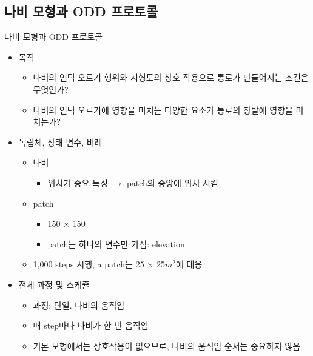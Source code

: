 \documentclass[hyperref={unicode}]{beamer}
\begin{document}
\subsection*{나비 모형과 ODD 프로토콜}
\begin{frame}{나비 모형과 ODD 프로토콜}
\begin{itemize}
\item 목적
	\begin{itemize}
	\item 나비의 언덕 오르기 행위와 지형도의 상호 작용으로 통로가 만들어지는 조건은 무엇인가?
	\item 나비의 언덕 오르기에 영향을 미치는 다양한 요소가 통로의 창발에 영향을 미치는가?
	\end{itemize}
\end{itemize}	
\end{frame}

\begin{frame}
\begin{itemize}
\item 독립체, 상태 변수, 비례
	\begin{itemize}
	\item 나비
		\begin{itemize}
		\item 위치가 중요 특징 $\rightarrow$ patch의 중앙에 위치 시킴
		\end{itemize}
	\item patch
		\begin{itemize}
		\item 150 $\times$ 150 
		\item patch는 하나의 변수만 가짐: elevation
		\end{itemize}
	\item 1,000 steps 시행, a patch는 25 $\times$ 25$m^{2}$에 대응
	\end{itemize}
\end{itemize}	
\end{frame}

\begin{frame}
\begin{itemize}
\item 전체 과정 및 스케쥴 
	\begin{itemize}
	\item 과정: 단일. 나비의 움직임
	\item 매 step마다 나비가 한 번 움직임
	\item 기본 모형에서는 상호작용이 없으므로, 나비의 움직임 순서는 중요하지 않음 
	\end{itemize}
\end{itemize}	
\end{frame}
\end{document}
